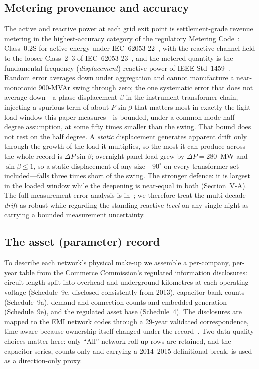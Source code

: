 \documentclass[journal]{IEEEtran}
\begin{document}
\subsection{Metering provenance and accuracy}
The active and reactive power at each grid exit point is settlement-grade revenue
metering in the highest-accuracy category of the regulatory Metering
Code~\cite{eipc_part10}: Class~0.2S for active energy under IEC~62053-22~\cite{iec62053_22}, with the reactive channel held to the looser Class~2--3 of IEC~62053-23~\cite{iec62053_23}, and the metered quantity is the
fundamental-frequency (\emph{displacement}) reactive power of IEEE Std~1459~\cite{ieee1459}. Random error averages down under aggregation and cannot
manufacture a near-monotonic 900-MVAr swing through zero; the one systematic
error that does not average down---a phase displacement $\beta$ in the
instrument-transformer chain, injecting a spurious term of about $P\sin\beta$
that matters most in exactly the light-load window this paper measures---is bounded,
under a common-mode half-degree assumption, at some fifty times smaller than the
swing. That bound does not rest on the half degree. A \emph{static} displacement generates apparent drift only through the growth of the load it multiplies, so the most it can produce across the whole record is $\Delta P\sin\beta$; overnight panel load grew by $\Delta P=280$~MW and $\sin\beta\leq1$, so a static displacement of any size---$90^\circ$ on every transformer set included---falls three times short of the swing. The stronger defence: it is largest in the loaded window while the
deepening is near-equal in both (Section~V-A). The full measurement-error analysis is in~\cite{hume_extended}; we therefore treat the multi-decade \emph{drift} as
robust while regarding the standing reactive \emph{level} on any single night as
carrying a bounded measurement uncertainty.

\subsection{The asset (parameter) record}
To describe each network's physical make-up we assemble a per-company, per-year
table from the Commerce Commission's regulated information disclosures: circuit
length split into overhead and underground kilometres at each operating voltage
(Schedule~9c, disclosed consistently from 2013), capacitor-bank counts
(Schedule~9a), demand and connection counts and embedded generation (Schedule~9e), and the regulated
asset base (Schedule~4). The disclosures are mapped to the EMI network codes
through a 29-year validated correspondence, time-aware because ownership itself
changed under the record~\cite{hume_extended}. Two data-quality choices matter here: only
``All''-network roll-up rows are retained, and the capacitor series, counts only
and carrying a 2014--2015 definitional break, is used as a direction-only proxy.
\end{document}
